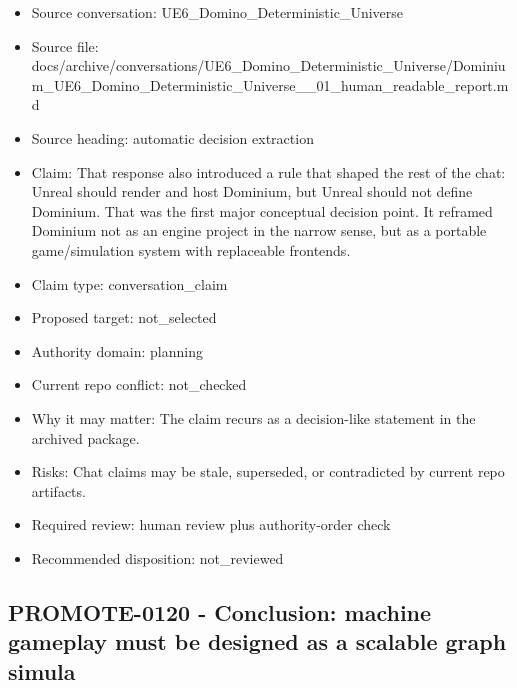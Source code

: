 \documentclass[11pt,a4paper]{report}
\begin{document}
\begin{itemize}
\item Source conversation: UE6\_Domino\_Deterministic\_Universe
\item Source file: docs/archive/conversations/UE6\_Domino\_Deterministic\_Universe/Dominium\_UE6\_Domino\_Deterministic\_Universe\_\_01\_human\_readable\_report.md
\item Source heading: automatic decision extraction
\item Claim: That response also introduced a rule that shaped the rest of the chat: Unreal should render and host Dominium, but Unreal should not define Dominium. That was the first major conceptual decision point. It reframed Dominium not as an engine project in the narrow sense, but as a portable game/simulation system with replaceable frontends.
\item Claim type: conversation\_claim
\item Proposed target: not\_selected
\item Authority domain: planning
\item Current repo conflict: not\_checked
\item Why it may matter: The claim recurs as a decision-like statement in the archived package.
\item Risks: Chat claims may be stale, superseded, or contradicted by current repo artifacts.
\item Required review: human review plus authority-order check
\item Recommended disposition: not\_reviewed
\end{itemize}

\subsection{PROMOTE-0120 - Conclusion: machine gameplay must be designed as a scalable graph simula}
\end{document}

